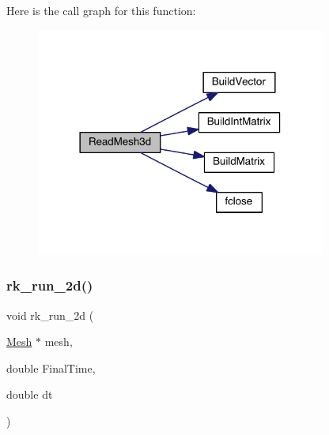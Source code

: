 Here is the call graph for this function\+:\nopagebreak
\begin{figure}[H]
\begin{center}
\leavevmode
\includegraphics[width=270pt]{a00554_ae31747f9df306a59e6f4df61fddfe15f_cgraph}
\end{center}
\end{figure}
\mbox{\label{a00554_a21a02761bc746f8e6205d02f662aee16}} 
\subsubsection{\texorpdfstring{rk\+\_\+run\+\_\+2d()}{rk\_run\_2d()}}
{\footnotesize\ttfamily void rk\+\_\+run\+\_\+2d (\begin{DoxyParamCaption}\item[{\hyperlink{a00557_aeffbe0891ab73a4d8964c9cb7978426e}{Mesh} $\ast$}]{mesh,  }\item[{double}]{Final\+Time,  }\item[{double}]{dt }\end{DoxyParamCaption})}

